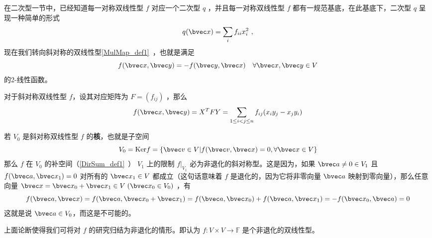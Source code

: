 
在二次型一节中，已经知道每一对称双线性型 $f$ 对应一个二次型 $q$ ，并且每一对称双线性型 $f$ 都有一规范基底，在此基底下，二次型 $q$ 呈现一种简单的形式
\begin{equation}
q(\bvec x)=\sum_{i}f_{ii}x_i^2~,
\end{equation}
现在我们转向斜对称的双线性型\autoref{MulMap_def1}~，也就是满足 
\begin{equation}
f(\bvec x,\bvec y)=-f(\bvec y,\bvec x)\quad \forall \bvec x,\bvec y\in V
\end{equation}
的2-线性函数。

对于斜对称双线性型 $f$，设其对应矩阵为 $F=(f_{ij})$ ，那么
\begin{equation}
f(\bvec x,\bvec y)=X^{T}FY=\sum_{1\leq i<j\leq n}f_{ij}(x_iy_j-x_jy_i)
\end{equation}

若 $V_0$ 是斜对称双线性型 $f$ 的\textbf{核}，也就是子空间
\begin{equation}
V_0=\mathrm{Ker} f=\{\bvec v\in V|f(\bvec v,\bvec x)=0,\forall\bvec x\in V\}
\end{equation}
那么 $f$ 在 $V_0$ 的补空间（\autoref{DirSum_def1}~） $V_1$ 上的限制 $f|_{V_1}$ 必为非退化的斜对称型。这是因为，如果 $\bvec a\neq0\in V_1$ 且 $f(\bvec a,\bvec x_1)=0$ 对所有的 $\bvec x_1\in V$ 都成立（这句话意味着 $f$ 是退化的，因为它将非零向量 $\bvec a$ 映射到零向量），那么任意向量 $\bvec x=\bvec x_0+\bvec x_1\in V \;(\bvec x_0\in V_0)$ ，有
\begin{equation}
f(\bvec a,\bvec x)=f(\bvec a,\bvec x_0+\bvec x_1)=f(\bvec a,\bvec x_0)+f(\bvec a,\bvec x_1)=-f(\bvec x_0,\bvec a)=0
\end{equation}
 这就是说 $\bvec a\in V_0$，而这是不可能的。

 上面论断使得我们可将对 $f$ 的研究归结为非退化的情形。即认为 $f:V\times V\rightarrow\mathbb{F}$ 是个非退化的双线性型。
